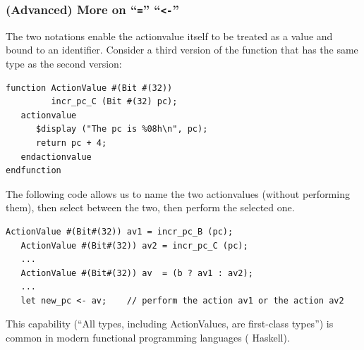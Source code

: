 \begin{frame}[fragile]
\frametitle{(Advanced) More on ``{\tt =}'' {\vs} ``{\tt <-}''}
\footnotesize

The two notations enable the actionvalue itself to be treated as a
value and bound to an identifier.  Consider a third version of the
function that has the same type as the second version:

\begin{center}
\begin{minipage}{0.45\textwidth}
\begin{Verbatim}[frame=single]
function ActionValue #(Bit #(32))
         incr_pc_C (Bit #(32) pc);
   actionvalue
      $display ("The pc is %08h\n", pc);
      return pc + 4;
   endactionvalue
endfunction
\end{Verbatim}
\end{minipage}
\end{center}

The following code allows us to name the two actionvalues (without
performing them), then select between the two, then perform the
selected one.

\begin{Verbatim}[frame=single]
   ActionValue #(Bit#(32)) av1 = incr_pc_B (pc);
   ActionValue #(Bit#(32)) av2 = incr_pc_C (pc);
   ...
   ActionValue #(Bit#(32)) av  = (b ? av1 : av2);
   ...
   let new_pc <- av;    // perform the action av1 or the action av2
\end{Verbatim}

This capability (``All types, including ActionValues, are first-class
types'') is common in modern functional programming languages ({\eg}
Haskell).

\end{frame}



